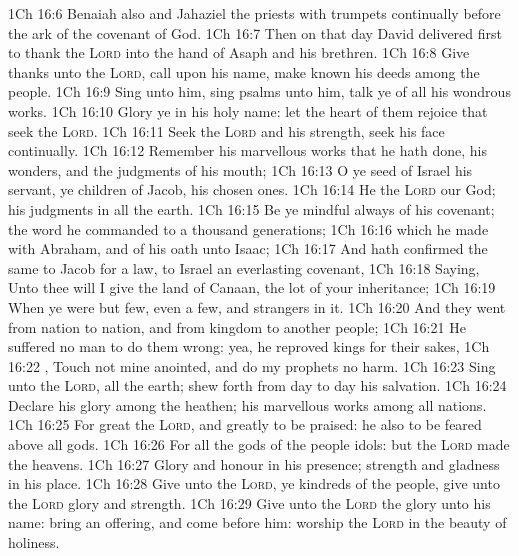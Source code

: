 \vs 1Ch 16:6 Benaiah also and Jahaziel the priests with trumpets continually before the ark of the covenant of God.
\vs 1Ch 16:7 Then on that day David delivered first  to thank the \textsc{Lord} into the hand of Asaph and his brethren.
\vs 1Ch 16:8 Give thanks unto the \textsc{Lord}, call upon his name, make known his deeds among the people.
\vs 1Ch 16:9 Sing unto him, sing psalms unto him, talk ye of all his wondrous works.
\vs 1Ch 16:10 Glory ye in his holy name: let the heart of them rejoice that seek the \textsc{Lord}.
\vs 1Ch 16:11 Seek the \textsc{Lord} and his strength, seek his face continually.
\vs 1Ch 16:12 Remember his marvellous works that he hath done, his wonders, and the judgments of his mouth;
\vs 1Ch 16:13 O ye seed of Israel his servant, ye children of Jacob, his chosen ones.
\vs 1Ch 16:14 He  the \textsc{Lord} our God; his judgments  in all the earth.
\vs 1Ch 16:15 Be ye mindful always of his covenant; the word  he commanded to a thousand generations;
\vs 1Ch 16:16  which he made with Abraham, and of his oath unto Isaac;
\vs 1Ch 16:17 And hath confirmed the same to Jacob for a law,  to Israel  an everlasting covenant,
\vs 1Ch 16:18 Saying, Unto thee will I give the land of Canaan, the lot of your inheritance;
\vs 1Ch 16:19 When ye were but few, even a few, and strangers in it.
\vs 1Ch 16:20 And  they went from nation to nation, and from  kingdom to another people;
\vs 1Ch 16:21 He suffered no man to do them wrong: yea, he reproved kings for their sakes,
\vs 1Ch 16:22 , Touch not mine anointed, and do my prophets no harm.
\vs 1Ch 16:23 Sing unto the \textsc{Lord}, all the earth; shew forth from day to day his salvation.
\vs 1Ch 16:24 Declare his glory among the heathen; his marvellous works among all nations.
\vs 1Ch 16:25 For great  the \textsc{Lord}, and greatly to be praised: he also  to be feared above all gods.
\vs 1Ch 16:26 For all the gods of the people  idols: but the \textsc{Lord} made the heavens.
\vs 1Ch 16:27 Glory and honour  in his presence; strength and gladness  in his place.
\vs 1Ch 16:28 Give unto the \textsc{Lord}, ye kindreds of the people, give unto the \textsc{Lord} glory and strength.
\vs 1Ch 16:29 Give unto the \textsc{Lord} the glory  unto his name: bring an offering, and come before him: worship the \textsc{Lord} in the beauty of holiness.
